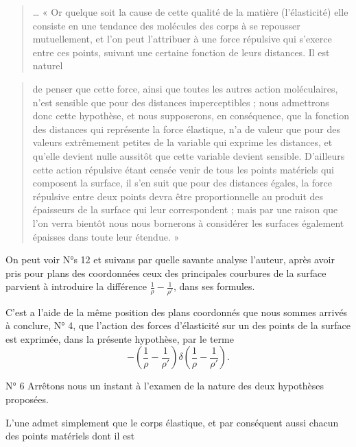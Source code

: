 \documentclass[11pt,a4paper]{article}
\begin{document}
\begin{quote}
\ldots{} « Or quelque soit la cause de cette qualité de la matière
(l'élasticité) elle consiste en une tendance des molécules des corps à se
repousser mutuellement, et l'on peut l'attribuer à une force répulsive qui
s'exerce entre ces points, suivant une certaine fonction de leurs distances.
Il est naturel
\end{quote}

\begin{quote}
de penser que cette force, ainsi que toutes les autres action moléculaires,
n'est sensible que pour des distances imperceptibles ; nous admettrons donc
cette hypothèse, et nous supposerons, en conséquence, que la fonction des
distances qui représente la force élastique, n'a de valeur que pour des
valeurs extrêmement petites de la variable qui exprime les distances, et
qu'elle devient nulle aussitôt que cette variable devient sensible. D'ailleurs
cette action répulsive étant censée venir de tous les points matériels qui
composent la surface, il s'en suit que pour des distances égales, la force
répulsive entre deux points devra être proportionnelle au produit des
épaisseurs de la surface qui leur correspondent ; mais par une raison que l'on
verra bientôt nous nous bornerons à considérer les surfaces également épaisses
dans toute leur étendue. »
\end{quote}

On peut voir N°s 12 et suivans par quelle savante analyse l'auteur, après
avoir pris pour plans des coordonnées ceux des principales courbures de la
surface parvient à introduire la différence
$\frac{1}{\rho} - \frac{1}{\rho'}$, dans ses formules.

C'est a l'aide de la même position des plans coordonnés que nous sommes
arrivés à conclure, N° 4, que l'action des forces d'élasticité sur un des
points de la surface est exprimée, dans la présente hypothèse, par le terme
\[
  -\left( \frac{1}{\rho} - \frac{1}{\rho'} \right)
  \delta\left( \frac{1}{\rho} - \frac{1}{\rho'} \right) .
\]

N° 6 Arrêtons nous un instant à l'examen de la nature des deux hypothèses
proposées.

L'une admet simplement que le corps élastique, et par conséquent aussi chacun
des points matériels dont il est

\end{document}
